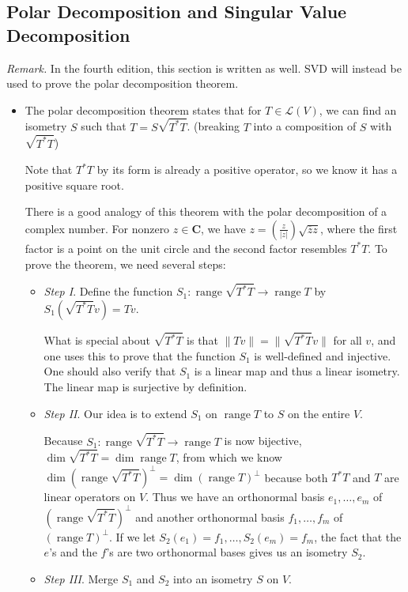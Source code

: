 \documentclass[11pt]{article}
\newcommand{\C}{\mathbf{C}}
\renewcommand{\r}{\operatorname{range}}
\renewcommand{\d}{\dim}
\newcommand{\conj}[1]{\overline{#1}}
\newcommand{\nm}[1]{\lVert #1 \rVert}
\newcommand{\abs}[1]{\lvert #1 \rvert}
\newcommand{\LV}{\mathcal{L}(V)}
\begin{document}
\subsection{Polar Decomposition and Singular Value Decomposition}
\textit{Remark.} In the fourth edition, this section is written as well. SVD will instead be used to prove the polar decomposition theorem.
\begin{itemize}
\item The polar decomposition theorem states that for $T \in \LV$, we can find an isometry $S$ such that $T = S \sqrt{T^*T}$. (breaking $T$ into a composition of $S$ with $\sqrt{T^*T}$)

Note that $T^*T$ by its form is already a positive operator, so we know it has a positive square root.

There is a good analogy of this theorem with the polar decomposition of a complex number. For nonzero $z \in \C$, we have $z = \left(\frac{z}{\abs{z}}\right)\sqrt{\conj{z}z}$, where the first factor is a point on the unit circle and the second factor resembles $T^*T$. To prove the theorem, we need several steps:
\begin{itemize}
    \item \textit{Step I}. Define the function $S_1: \r \sqrt{T^*T} \to \r T$ by $S_1(\sqrt{T^*T}v)=Tv$.
    
    What is special about $\sqrt{T^*T}$ is that $\nm{Tv}=\nm{\sqrt{T^*T}v}$ for all $v$, and one uses this to prove that the function $S_1$ is well-defined and injective. One should also verify that $S_1$ is a linear map and thus a linear isometry. The linear map is surjective by definition.
    
    \item \textit{Step II}. Our idea is to extend $S_1$ on $\r T$ to $S$ on the entire $V$. 
    
    Because $S_1: \r \sqrt{T^*T} \to \r T$ is now bijective, $\d \sqrt{T^*T} = \d \r T$, from which we know $\d(\r \sqrt{T^*T})^\perp = \d(\r T)^\perp$ because both $T^*T$ and $T$ are linear operators on $V$. Thus we have an orthonormal basis $e_1,\dots,e_m$ of $(\r \sqrt{T^*T})^\perp$ and another orthonormal basis $f_1,\dots,f_m$ of $(\r T)^\perp$. If we let $S_2(e_1) = f_1,\dots,S_2(e_m)=f_m$, the fact that the $e$'s and the $f$'s are two orthonormal bases gives us an isometry $S_2$.
    
    \item \textit{Step III}. Merge $S_1$ and $S_2$ into an isometry $S$ on $V$.
    

\end{itemize}
\end{itemize}
\end{document}
